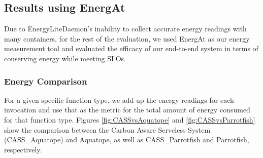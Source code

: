\documentclass[times, 10pt,twocolumn]{article}
\begin{document}



\subsection{Results using EnergAt}

Due to EnergyLiteDaemon's inability to collect accurate energy readings with many containers, for the rest of the evaluation, we used EnergAt as our energy measurement tool and evaluated the efficacy of our end-to-end system in terms of conserving energy while meeting SLOs. 

\subsubsection{Energy Comparison}
For a given specific function type, we add up the energy readings for each invocation and use that as the metric for the total amount of energy consumed for that function type. Figures \ref{fig:CASSvsAquatope} and \ref{fig:CASSvsParrotfish} show the comparison between the Carbon Aware Serveless System (CASS\_Aquatope) and Aquatope, as well as CASS\_Parrotfish and Parrotfish, respectively. 
\end{document}
